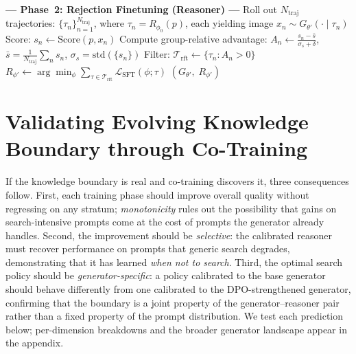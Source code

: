 \documentclass{article}
\begin{document}
\begin{algorithm}[h]
\begin{algorithmic}[1]
\Statex \textbf{--- Phase~2: Rejection Finetuning (Reasoner) ---}
    \State Roll out $N_{\mathrm{traj}}$ trajectories: $\{\tau_n\}_{n=1}^{N_{\mathrm{traj}}}$, where $\tau_n = R_{\phi_0}(p)$, each yielding image $x_n \sim G_{\theta'}(\cdot \mid \tau_n)$
    \State Score: $s_n \leftarrow \text{Score}(p, x_n)$
    \State Compute group-relative advantage: $A_n \leftarrow \frac{s_n - \bar{s}}{\sigma_s + \delta}$, \; $\bar{s} = \frac{1}{N_{\mathrm{traj}}}\sum_n s_n$, \; $\sigma_s = \mathrm{std}(\{s_n\})$
\EndFor
\State Filter: $\mathcal{T}_{\mathrm{rft}} \leftarrow \{\tau_n : A_n > 0\}$ 
\State $R_{\phi'} \leftarrow \arg\min_\phi \sum_{\tau \in \mathcal{T}_{\mathrm{rft}}} \mathcal{L}_{\mathrm{SFT}}(\phi; \tau)$
\Statex
\State \Return $(G_{\theta'},\; R_{\phi'})$
\end{algorithmic}
\end{algorithm}



\section{Validating Evolving Knowledge Boundary through Co-Training}
\label{sec:experiments}

If the knowledge boundary is real and co-training discovers it, three consequences follow.
First, each training phase should improve overall quality without regressing on any stratum; \emph{monotonicity} rules out the possibility that gains on search-intensive prompts come at the cost of prompts the generator already handles.
Second, the improvement should be \emph{selective}: the calibrated reasoner must recover performance on prompts that generic search degrades, demonstrating that it has learned \emph{when not to search}.
Third, the optimal search policy should be \emph{generator-specific}: a policy calibrated to the base generator should behave differently from one calibrated to the DPO-strengthened generator, confirming that the boundary is a joint property of the generator--reasoner pair rather than a fixed property of the prompt distribution.
We test each prediction below; per-dimension breakdowns and the broader generator landscape appear in the appendix.
\end{document}
